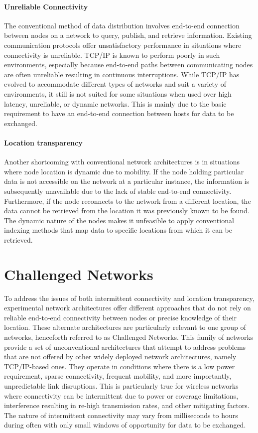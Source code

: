 \documentclass[a4paper,12pt]{report}      %
\begin{document}
\paragraph{Unreliable Connectivity}
The conventional method of data distribution involves end-to-end connection between nodes on a network to query, publish, and retrieve information. Existing communication protocols offer unsatisfactory performance in situations where connectivity is unreliable. TCP/IP is known to perform poorly in such environments, especially because end-to-end paths between communicating nodes are often unreliable resulting in continuous interruptions\cite{tcpbreak}. 
While TCP/IP has evolved to accommodate different types of networks and suit a variety of environments, it still is not suited for some situations when used over high latency, unreliable, or dynamic networks. This is mainly due to the basic requirement to have an end-to-end connection between hosts for data to be exchanged.

\paragraph{Location transparency}
Another shortcoming with conventional network architectures is in situations where node location is dynamic due to mobility. If the node holding particular data is not accessible on the network at a particular instance, the information is subsequently unavailable due to the lack of stable end-to-end connectivity. Furthermore, if the node reconnects to the network from a different location, the data cannot be retrieved from the location it was previously known to be found. The dynamic nature of the nodes makes it unfeasible to apply conventional indexing methods that map data to specific locations from which it can be retrieved.

\section{Challenged Networks}  

To address the issues of both intermittent connectivity and location transparency, experimental network
architectures offer different approaches that do not rely on reliable end-to-end connectivity between
nodes or precise knowledge of their location. These alternate architectures are particularly relevant to
one group of networks, henceforth referred to as Challenged Networks. This family of networks
provide a set of unconventional architectures that attempt to address problems that are not offered by
other widely deployed network architectures, namely TCP/IP-based ones. They operate in conditions
where there is a low power requirement, sparse connectivity, frequent mobility, and more importantly,
unpredictable link disruptions. This is particularly true for wireless networks where connectivity can be
intermittent due to power or coverage limitations, interference resulting in re-high transmission rates,
and other mitigating factors. The nature of intermittent connectivity may vary from milliseconds to
hours during often with only small windows of opportunity for data to be exchanged\cite{DTNarch}. 
\end{document}

